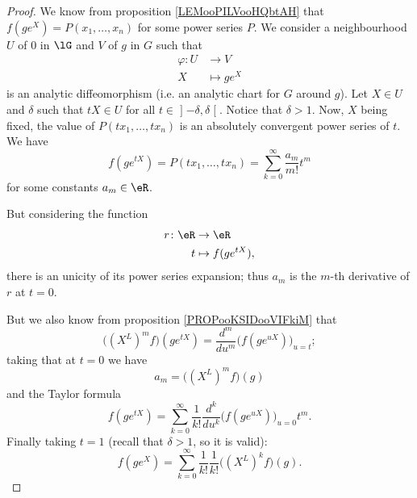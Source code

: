 \begin{proof}
	We know from proposition \ref{LEMooPILVooHQbtAH} that \( f(g e^{X})=P(x_1,\ldots, x_n)\) for some power series \( P\). We consider a neighbourhood \( U\) of \( 0\) in \( \lG\) and \( V\) of \( g\) in \( G\) such that
	\begin{equation}
		\begin{aligned}
			\varphi\colon U & \to V           \\
			X               & \mapsto  ge^{X}
		\end{aligned}
	\end{equation}
	is an analytic diffeomorphism (i.e. an analytic chart for \( G\) around \( g\)). Let \( X\in U\) and \( \delta\) such that \( tX\in U\) for all \( t\in \mathopen] -\delta , \delta \mathclose[\). Notice that \( \delta>1\). Now, \( X\) being fixed, the value of \( P(tx_1,\ldots, tx_n)\) is an absolutely convergent power series of \( t\). We have
	\begin{equation}
		f(g e^{tX})=P(tx_1,\ldots, tx_n)=\sum_{k=0}^{\infty}\frac{ a_m }{ m! }t^m
	\end{equation}
	for some constants \( a_m\in \eR\).

	But considering the function
	\begin{equation}
		\begin{aligned}
			r\colon \eR & \to \eR              \\
			t           & \mapsto f(g e^{tX}),
		\end{aligned}
	\end{equation}
	there is an unicity of its power series expansion; thus \( a_m\) is the \( m\)-th derivative of \( r\) at \( t=0\).

	But we also know from proposition \ref{PROPooKSIDooVIFkiM} that
	\begin{equation}
		\big( (X^L)^mf \big)(g e^{tX})=\frac{ d^m }{ du^m }\big( f(g e^{uX}) \big)_{u=t};
	\end{equation}
	taking that at \( t=0\) we have
	\begin{equation}
		a_m=\big( (X^L)^mf \big)(g)
	\end{equation}
	and the Taylor formula
	\begin{equation}
		f(g e^{tX})=\sum_{k=0}^{\infty}\frac{1}{ k! }\frac{ d^k }{ du^k }\big( f(g e^{uX}) \big)_{u=0}t^m.
	\end{equation}
	Finally taking \( t=1\) (recall that \( \delta>1\), so it is valid):
	\begin{equation}
		f(g e^{X})=\sum_{k=0}^{\infty}\frac{1}{ k! }\frac{1}{ k! }\big( (X^L)^kf \big)(g).
	\end{equation}
\end{proof}

